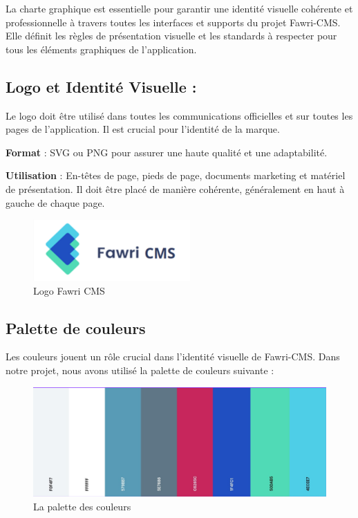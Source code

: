 \hspace{\parindent}La charte graphique est essentielle pour garantir une identité visuelle cohérente et professionnelle à travers toutes les interfaces et supports du projet Fawri-CMS. Elle définit les règles de présentation visuelle et les standards à respecter pour tous les éléments graphiques de l'application.

\subsection{Logo et Identité Visuelle :}

\hspace{\parindent}Le logo doit être utilisé dans toutes les communications officielles et sur toutes les pages de l'application. Il est crucial pour l'identité de la marque.

\textbf{Format} : SVG ou PNG pour assurer une haute qualité et une adaptabilité.

\textbf{Utilisation} : En-têtes de page, pieds de page, documents marketing et matériel de présentation. Il doit être placé de manière cohérente, généralement en haut à gauche de chaque page.
\\
\begin{figure}[H] 
    \centering
    \includegraphics[width=6cm]{Figures/fawri_cms_logo.PNG}
    \caption{Logo Fawri CMS}
\end{figure}


\subsection{Palette de couleurs}
\hspace{\parindent}Les couleurs jouent un rôle crucial dans l'identité visuelle de Fawri-CMS. Dans notre projet, nous avons utilisé la palette de couleurs suivante :
\\
\begin{figure}[H] 
    \centering
    \includegraphics[width=12cm]{Figures/palette.PNG}
    \caption{La palette des couleurs}
\end{figure}



